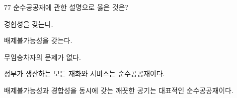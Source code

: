 \begin{question}{77}
순수공공재에 관한 설명으로 옳은 것은?
\begin{choices}
  \item 경합성을 갖는다.
  \item 배제불가능성을 갖는다.
  \item 무임승차자의 문제가 없다.
  \item 정부가 생산하는 모든 재화와 서비스는 순수공공재이다.
  \item 배제불가능성과 경합성을 동시에 갖는 깨끗한 공기는 대표적인 순수공공재이다.
\end{choices}
\end{question}
